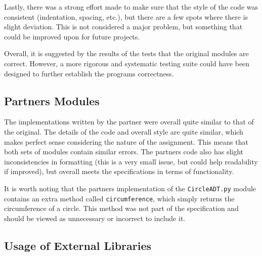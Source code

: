 \documentclass[12pt]{article}
\begin{document}
Lastly, there was a strong effort made to make sure that the style of the code was consistent (indentation, spacing, etc.), but there are a few spots where there is slight deviation. This is not considered a major problem, but something that could be improved upon for future projects.

Overall, it is suggested by the results of the tests that the original modules are correct. However, a more rigorous and systematic testing suite could have been designed to further establish the programs correctness.

\subsection{Partners Modules}

The implementations written by the partner were overall quite similar to that of the original. The details of the code and overall style are quite similar, which makes perfect sense considering the nature of the assignment. This means that both sets of modules contain similar errors. The partners code also has slight inconsistencies in formatting (this is a very small issue, but could help readability if improved), but overall meets the specifications in terms of functionality. 

It is worth noting that the partners implementation of the {\tt CircleADT.py} module contains an extra method called {\tt circumference}, which simply returns the circumference of a circle. This method was not part of the specification and should be viewed as unnecessary or incorrect to include it. 

\subsection{Usage of External Libraries}
\end{document}
